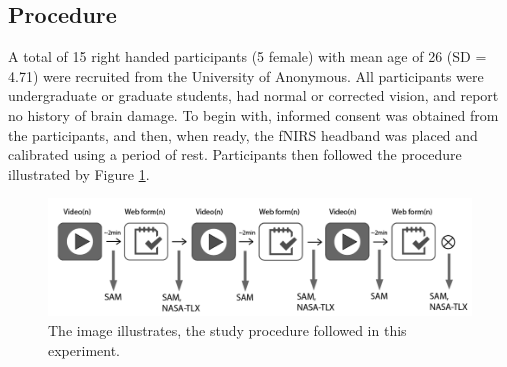 \documentclass[../main/Feedback.tex]{subfiles}
\begin{document}

\subsection{Procedure}
A total of 15 right handed participants (5 female) with mean age of 26 (SD = 4.71) were recruited from the University of Anonymous.
All participants were undergraduate or graduate students, had normal or corrected vision, and report no history of brain damage. %
To begin with, informed consent was obtained from the participants, and then, when ready, the fNIRS headband was placed and calibrated using a period of rest. Participants then followed the procedure illustrated by Figure \ref{fig:study-procedure}. 


\begin{figure}[h]
	\centering
	\includegraphics[width=\linewidth]{../figures/study-procedure}
	\caption[study procedure]{The image illustrates, the study procedure followed in this experiment.}
	\label{fig:study-procedure}
\end{figure}
\end{document}
